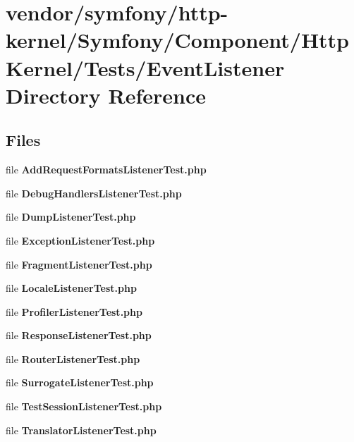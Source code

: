 \section{vendor/symfony/http-\/kernel/\+Symfony/\+Component/\+Http\+Kernel/\+Tests/\+Event\+Listener Directory Reference}
\label{dir_e3dec04b620f001c29ec95748272a08a}
\subsection*{Files}
\begin{DoxyCompactItemize}
\item 
file {\bf Add\+Request\+Formats\+Listener\+Test.\+php}
\item 
file {\bf Debug\+Handlers\+Listener\+Test.\+php}
\item 
file {\bf Dump\+Listener\+Test.\+php}
\item 
file {\bf Exception\+Listener\+Test.\+php}
\item 
file {\bf Fragment\+Listener\+Test.\+php}
\item 
file {\bf Locale\+Listener\+Test.\+php}
\item 
file {\bf Profiler\+Listener\+Test.\+php}
\item 
file {\bf Response\+Listener\+Test.\+php}
\item 
file {\bf Router\+Listener\+Test.\+php}
\item 
file {\bf Surrogate\+Listener\+Test.\+php}
\item 
file {\bf Test\+Session\+Listener\+Test.\+php}
\item 
file {\bf Translator\+Listener\+Test.\+php}
\end{DoxyCompactItemize}
